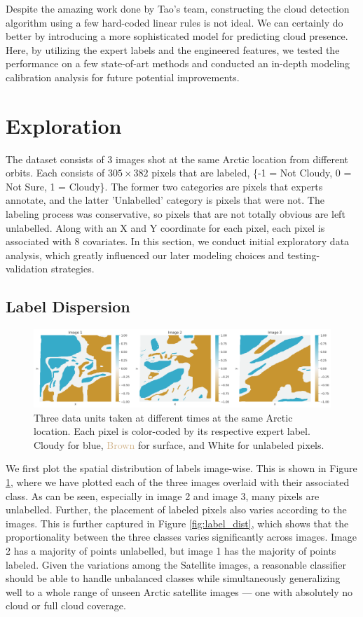 \documentclass[11pt, letterpaper, journal]{IEEEtran}
\begin{document}
Despite the amazing work done by Tao's team, constructing the cloud detection algorithm using a few hard-coded linear rules is not ideal. We can certainly do better by introducing a more sophisticated model for predicting cloud presence. Here, by utilizing the expert labels and the engineered features, we tested the performance on a few state-of-art methods and conducted an in-depth modeling calibration analysis for future potential improvements. 

\section{Exploration}
The dataset consists of 3 images shot at the same Arctic location from different orbits. Each consists of $305 \times 382$ pixels that are labeled, \{-1 = Not Cloudy, 0 = Not Sure, 1 = Cloudy\}. The former two categories are pixels that experts annotate, and the latter 'Unlabelled' category is pixels that were not. The labeling process was conservative, so pixels that are not totally obvious are left unlabelled. Along with an X and Y coordinate for each pixel, each pixel is associated with 8 covariates. In this section, we conduct initial exploratory data analysis, which greatly influenced our later modeling choices and testing-validation strategies.

\subsection{Label Dispersion}
\begin{figure}[!h]
\centering
\includegraphics[width=1.0\textwidth]{1.a.png}
\caption{Three data units taken at different times at the same Arctic location. Each pixel is color-coded by its respective expert label. Cloudy for \textcolor{BlueGreen}{blue}, \textcolor{Tan}{Brown} for surface, and White for unlabeled pixels.}
\label{fig:image_labels}
\end{figure}

We first plot the spatial distribution of labels image-wise. This is shown in Figure \ref{fig:image_labels}, where we have plotted each of the three images overlaid with their associated class. As can be seen, especially in image 2 and image 3, many pixels are unlabelled. Further, the placement of labeled pixels also varies according to the images. This is further captured in Figure \ref{fig:label_dist}, which shows that the proportionality between the three classes varies significantly across images. Image 2 has a majority of points unlabelled, but image 1 has the majority of points labeled. Given the variations among the Satellite images, a reasonable classifier should be able to handle unbalanced classes while simultaneously generalizing well to a whole range of unseen Arctic satellite images --- one with absolutely no cloud or full cloud coverage.
\end{document}
